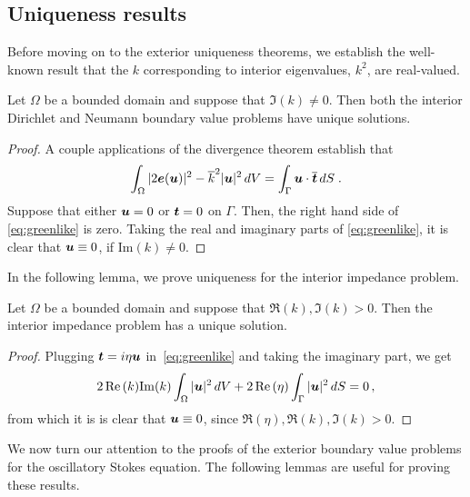 \subsection{Uniqueness results}

Before moving on to the exterior uniqueness theorems,
we establish the well-known result that
the $k$ corresponding to interior eigenvalues, $k^2$,
are real-valued.

\begin{thrm}
  Let $\Omega$ be a bounded domain and suppose that
  $\Im (k) \neq 0$. Then both the interior
  Dirichlet and Neumann boundary value problems have
  unique solutions.
\end{thrm}
\begin{proof}
  A couple applications of the divergence theorem establish
  that
  \begin{equation} \label{eq:greenlike}
    \int_\Omega |2{\boldsymbol e}({\boldsymbol u})|^2 - \overline{k}^2 |{\boldsymbol u}|^2 \, dV
    = \int_\Gamma {\boldsymbol u} \cdot \overline{{\boldsymbol t}} \, dS \; . 
  \end{equation}
  Suppose that either ${\boldsymbol u} = 0$ or ${\boldsymbol t} = 0$ on $\Gamma$.
  Then, the right hand side of \cref{eq:greenlike} is
  zero. 
  Taking the real and imaginary parts of \cref{eq:greenlike},
  it is clear that ${\boldsymbol u} \equiv 0$, if $\text{Im}(k) \neq 0$.
\end{proof}

In the following lemma, we prove uniqueness for the
interior impedance problem.

\begin{thrm}
  Let $\Omega$ be a bounded domain and suppose that
  $\Re(k),\Im (k) > 0$. Then the interior
  impedance problem has a unique solution.
\end{thrm}
\begin{proof}
  Plugging ${\boldsymbol t} = i\eta {\boldsymbol u}$ in~\cref{eq:greenlike}
  and taking the imaginary part, we get
  \begin{equation}
   2 \operatorname{Re}{(k)} {\textrm{\textup{Im}}}{(k)} \int_{\Omega} |{\boldsymbol u}|^2\, dV + 2\operatorname{Re}{(\eta)} \int_{\Gamma}
   |{\boldsymbol u}|^2 \, dS = 0 \, ,
  \end{equation}
  from which it is is clear that ${\boldsymbol u} \equiv 0$, since
  $\Re{(\eta)}, \Re{(k)}, \Im{(k)} > 0$.
\end{proof}

We now turn our attention to the proofs of the exterior boundary value problems
for the oscillatory Stokes equation. The following lemmas are useful for
proving these results.

